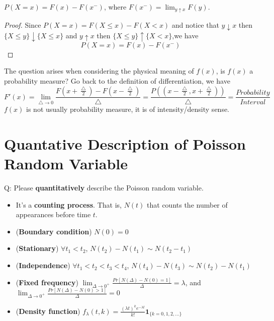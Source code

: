\documentclass[../Probability_Theory.tex]{subfiles}
\begin{document}
\begin{theorem}
$P(X=x)=F(x)-F(x^-)$, where $F(x^-)=\lim_{y\uparrow x}F(y).$
\end{theorem}
\begin{proof}
Since $P(X=x)=F(X\leq x)-F(X<x)$ and notice that  $y\downarrow x$ then $\{X\leq y\}\downarrow\{X\leq x\}$ and $y\uparrow x$ then $\{X\leq y\}\uparrow\{X<x \}$,we have $$P(X=x)=F(x)-F(x^-)$$
\end{proof}
The question arises when considering the physical meaning of $f(x)$, is $f(x)$ a probability measure? Go back to the definition of differentiation, we have
$$F'(x)=\lim_{\bigtriangleup\rightarrow 0}\frac{F(x+\frac{\bigtriangleup}{2})-F(x-\frac{\bigtriangleup}{2})}{\bigtriangleup}=\frac{P((x-\frac{\bigtriangleup}{2},x+\frac{\bigtriangleup}{2}))}{\bigtriangleup}=\frac{Probability}{Interval}$$ 
$f(x)$ is not usually probability measure, it is of intensity/density sense.

\section{Quantative Description of Poisson Random Variable}
Q: Please {\bf quantitatively} describe the Poisson random variable.
\begin{itemize}
	\item It's a {\bf counting process}. That is, $N(t)$ that counts the number of appearances before time $t$.
	\item ({\bf Boundary condition}) $N(0)=0$
	\item ({\bf Stationary}) $\forall t_1<t_2$, $N(t_2)-N(t_1)\sim N(t_2-t_1)$
	\item ({\bf Independence}) $\forall t_1<t_2<t_3<t_4$, $N(t_4)-N(t_3)\sim N(t_2)-N(t_1)$
	\item ({\bf Fixed frequency}) $\lim_{\Delta\rightarrow0^+} \frac{Pr[N(\Delta)-N(0) = 1]}{\Delta}=\lambda$, and $\lim_{\Delta\rightarrow0^+} \frac{Pr[N(\Delta)-N(0) > 1]}{\Delta}=0$
	\item ({\bf Density function}) $f_{\lambda}(t,k) = \frac{(\lambda t)^{k}e^{-\lambda t}}{k!}\mathbf{1}_{\{k=0,1,2,...\}}$
\end{itemize}
\end{document}
